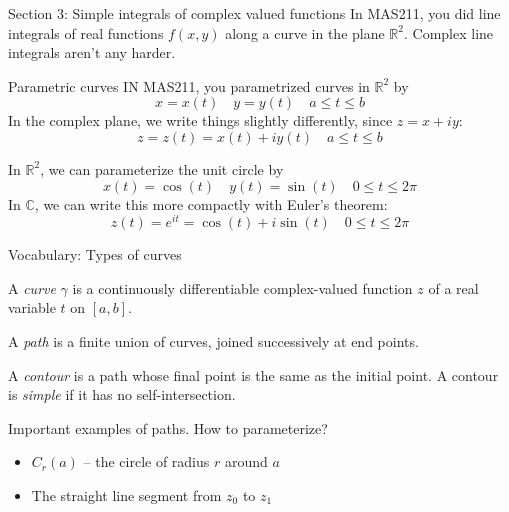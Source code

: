\documentclass{beamer}
\newcommand{\C}{\mathbb{C}}
\newcommand{\R}{\mathbb{R}}
\begin{document}
\begin{frame}{Section 3: Simple integrals of complex valued functions}
In MAS211, you did line integrals of real functions $f(x,y)$ along a curve in the plane $\R^2$. Complex line integrals aren't any harder.

\begin{block}{Parametric curves}
IN MAS211, you parametrized curves in $\R^2$ by 
$$x=x(t)\quad y=y(t)\quad a\leq t\leq b$$
In the complex plane, we write things slightly differently, since $z=x+iy$:
$$z=z(t)=x(t)+iy(t)\quad a\leq t\leq b$$
\end{block}

\end{frame}
\begin{frame}{}

\begin{Example}
In $\R^2$, we can parameterize the unit circle by
$$x(t)=\cos(t) \quad y(t)=\sin(t)\quad 0\leq t\leq 2\pi$$
In $\C$, we can write this more compactly with Euler's theorem:
$$z(t)=e^{it}=\cos(t)+i\sin(t) \quad 0\leq t\leq 2\pi$$
\end{Example}
\end{frame}
\begin{frame}{Vocabulary: Types of curves}

\begin{definition}[A curve]A \emph{curve} $\gamma$ is a continuously differentiable complex-valued function $z$ of a real variable $t$ on $[a,b]$.
\end{definition}

\begin{definition}[A path] A \emph{path} is a finite union of curves, joined successively at end points.\end{definition}

\begin{definition}[Contour] A \emph{contour} is a path whose final point is the same as the initial point.  A contour is \emph{simple} if it has no self-intersection.
\end{definition}

\begin{block}{Important examples of paths.  How to parameterize?}
\begin{itemize}
    \item $C_r(a)$ -- the circle of radius $r$ around $a$
    \item The straight line segment from $z_0$ to $z_1$
\end{itemize}
\end{block}
\end{frame}
\end{document}
